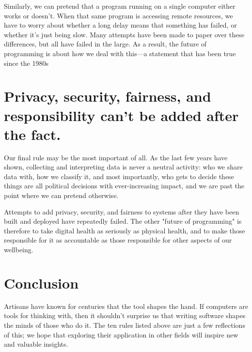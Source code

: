 \documentclass[10pt,letterpaper]{article}
\newcommand{\rulemajor}[1]{\section{#1}}
\begin{document}
Similarly, we can pretend that a program running on a single computer either
works or doesn't. When that same program is accessing remote resources, we have
to worry about whether a long delay means that something has failed, or whether
it's just being slow.  Many attempts have been made to paper over these
differences, but all have failed in the large.  As a result, the future of
programming is about how we deal with this---a statement that has been true
since the 1980s

\rulemajor{Privacy, security, fairness, and responsibility can't be added after the fact.}

Our final rule may be the most important of all.  As the last few years have
shown, collecting and interpreting data is never a neutral activity: who we
share data with, how we classify it, and most importantly, who gets to decide
these things are all political decisions with ever-increasing impact, and we are
past the point where we can pretend otherwise.

Attempts to add privacy, security, and fairness to systems after they have been
built and deployed have repeatedly failed.  The other "future of programming" is
therefore to take digital health as seriously as physical health, and to make
those responsible for it as accountable as those responsible for other aspects
of our wellbeing.

\section*{Conclusion}

Artisans have known for centuries that the tool shapes the hand.  If computers
are tools for thinking with, then it shouldn't surprise us that writing software
shapes the minds of those who do it.  The ten rules listed above are just a few
reflections of this; we hope that exploring their application in other fields
will inspire new and valuable insights.


\end{document}
